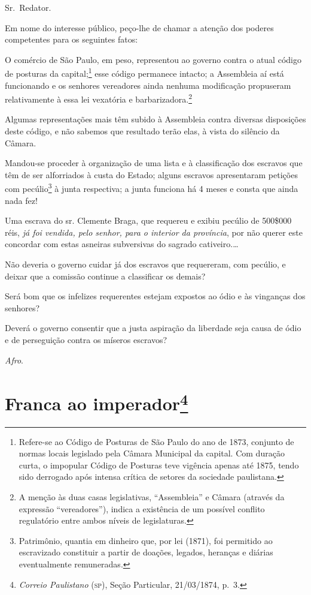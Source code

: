 Sr.~Redator.

Em nome do interesse público, peço-lhe de chamar a atenção dos poderes
competentes para os seguintes fatos:

O comércio de São Paulo, em peso, representou ao governo contra o atual
código de posturas da capital;\footnote{ Refere-se ao Código de
  Posturas de São Paulo do ano de 1873, conjunto de normas locais
  legislado pela Câmara Municipal da capital. Com duração curta, o
  impopular Código de Posturas teve vigência apenas até 1875, tendo sido
  derrogado após intensa crítica de setores da sociedade paulistana.}
esse código permanece intacto; a Assembleia aí está funcionando e os
senhores vereadores ainda nenhuma modificação propuseram relativamente à
essa lei vexatória e barbarizadora.\footnote{ A menção às duas casas
  legislativas, ``Assembleia'' e Câmara (através da expressão
  ``vereadores''), indica a existência de um possível conflito regulatório
  entre ambos níveis de legislaturas.}

Algumas representações mais têm subido à Assembleia contra diversas
disposições deste código, e não sabemos que resultado terão elas, à
vista do silêncio da Câmara.

Mandou-se proceder à organização de uma lista e à classificação dos
escravos que têm de ser alforriados à custa do Estado; alguns escravos
apresentaram petições com pecúlio\footnote{ Patrimônio, quantia em
  dinheiro que, por lei (1871), foi permitido ao escravizado constituir
  a partir de doações, legados, heranças e diárias eventualmente
  remuneradas.} à junta respectiva; a junta funciona há 4 meses e consta
que ainda nada fez!

Uma escrava do sr. Clemente Braga, que requereu e exibiu pecúlio de
500\$000 réis, \emph{já foi vendida, pelo senhor, para o interior da
província}, por não querer este concordar com estas asneiras subversivas
do sagrado cativeiro.\ldots{}

Não deveria o governo cuidar já dos escravos que requereram, com
pecúlio, e deixar que a comissão continue a classificar os demais?

Será bom que os infelizes requerentes estejam expostos ao ódio e às
vinganças dos senhores?

Deverá o governo consentir que a justa aspiração da liberdade seja causa
de ódio e de perseguição contra os míseros escravos?

\emph{Afro}.

\chapter{Franca ao imperador\footnote{\emph{Correio Paulistano} (\textsc{sp}), Seção Particular,
  21/03/1874, p.~3.}} %

